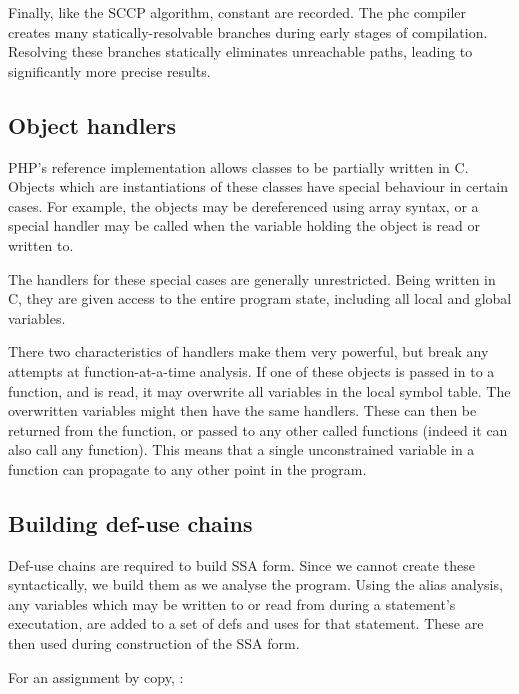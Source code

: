 Finally, like the SCCP algorithm, constant are recorded.
The phc compiler creates many statically-resolvable branches during early stages of compilation.
Resolving these branches statically eliminates unreachable paths, leading to significantly more precise results.



\subsection{Object handlers}

PHP's reference implementation allows classes to be partially written in C.
Objects which are instantiations of these classes have special behaviour in certain cases.
For example, the objects may be dereferenced using array syntax, or a special handler may be called when the variable holding the object is read or written to.

The handlers for these special cases are generally unrestricted.
Being written in C, they are given access to the entire program state, including all local and global variables.

There two characteristics of handlers make them very powerful, but break any attempts at function-at-a-time analysis.
If one of these objects is passed in to a function, and is read, it may overwrite all variables in the local symbol table.
The overwritten variables might then have the same handlers.
These can then be returned from the function, or passed to any other called functions (indeed it can also call any function).
This means that a single unconstrained variable in a function can propagate to any other point in the program.


\subsection{Building def-use chains}

Def-use chains are required to build SSA form.
Since we cannot create these syntactically, we build them as we analyse the program.
Using the alias analysis, any variables which may be written to or read from during a statement's executation, are added to a set of defs and uses for that statement.
These are then used during construction of the SSA form.

For an assignment by copy, :


